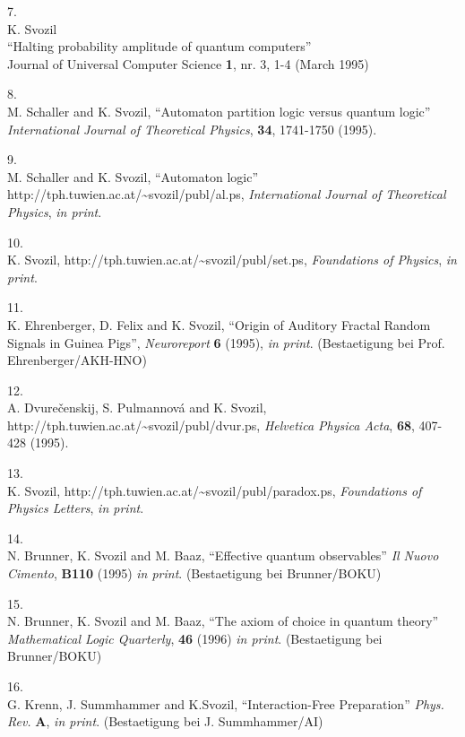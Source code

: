 7.\\
K. Svozil\\
``Halting probability amplitude of quantum
computers''\\
 Journal of Universal Computer Science
{\bf 1}, nr. 3, 1-4 (March 1995)


8.\\
 M. Schaller and K. Svozil,
``Automaton partition logic versus quantum logic''
{\sl International Journal of Theoretical Physics}, {\bf 34}, 1741-1750
(1995).


9.\\
 M. Schaller and K. Svozil,
``Automaton logic''
{http://tph.tuwien.ac.at/\~{}svozil/publ/al.ps},
{\sl International Journal of Theoretical Physics}, {\it in print}.

10.\\
K. Svozil,
{http://tph.tuwien.ac.at/\~{}svozil/publ/set.ps},
{\sl Foundations of Physics}, {\it in print}.


11.\\
K. Ehrenberger, D. Felix and K. Svozil,
``Origin of Auditory Fractal Random Signals in Guinea Pigs'',
{\sl Neuroreport} {\bf 6} (1995), {\it in print}.
(Bestaetigung bei Prof. Ehrenberger/AKH-HNO)


12.\\
A. Dvure\v{c}enskij, S. Pulmannov\'a and K. Svozil,
{http://tph.tuwien.ac.at/\~{}svozil/publ/dvur.ps},
{\sl Helvetica Physica Acta}, {\bf 68}, 407-428 (1995).

13.\\     K. Svozil,
{http://tph.tuwien.ac.at/\~{}svozil/publ/paradox.ps},
{\sl Foundations of Physics Letters}, {\it in print}.

14.\\
N. Brunner, K. Svozil and M. Baaz,
``Effective quantum observables''
{\sl Il Nuovo Cimento}, {\bf B110} (1995) {\it in print}.
(Bestaetigung bei Brunner/BOKU)


15.\\
N. Brunner, K. Svozil and M. Baaz,
``The axiom of choice in quantum theory''
{\sl Mathematical Logic Quarterly}, {\bf 46} (1996)  {\it in print}.
(Bestaetigung bei Brunner/BOKU)


16.\\
G. Krenn,  J. Summhammer and K.Svozil,
``Interaction-Free Preparation''
{\sl Phys. Rev.} {\bf A}, {\it in print}.
(Bestaetigung bei J. Summhammer/AI)



